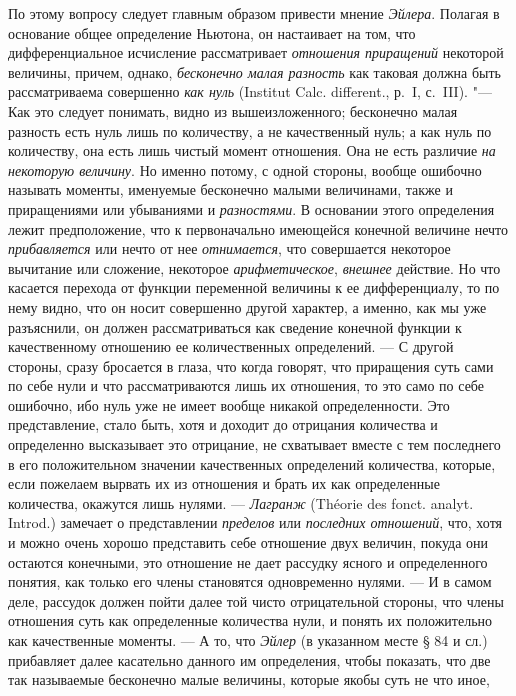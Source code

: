По этому вопросу следует главным образом привести мнение
{\em Эйлера}. Полагая в основание общее определение
Ньютона, он настаивает на том, что дифференциальное исчисление рассматривает
{\em отношения приращений} некоторой величины, причем,
однако, {\em бесконечно малая разность} как таковая
должна быть рассматриваема совершенно {\em как нуль}
(Institut Calc. different., р.~I, с.~III).
"--- Как это следует понимать, видно из
вышеизложенного; бесконечно малая разность есть нуль лишь по количеству, а
не качественный нуль; а как нуль по количеству, она есть лишь чистый момент
отношения. Она не есть различие {\em на некоторую
величину}. Но именно потому, с одной стороны, вообще ошибочно называть
моменты, именуемые бесконечно малыми величинами, также и приращениями или
убываниями и {\em разностями}. В основании этого
определения лежит предположение, что к первоначально имеющейся конечной
величине нечто {\em прибавляется} или нечто от нее
{\em отнимается}, что совершается некоторое вычитание
или сложение, некоторое {\em арифметическое},
{\em внешнее} действие. Но что касается перехода от
функции переменной величины к ее дифференциалу, то по нему видно, что он
носит совершенно другой характер, а именно, как мы уже разъяснили, он
должен рассматриваться как сведение конечной функции к качественному
отношению ее количественных определений. — С другой стороны, сразу
бросается в глаза, что когда говорят, что приращения суть сами по себе нули
и что рассматриваются лишь их отношения, то это само по себе ошибочно, ибо
нуль уже не имеет вообще никакой определенности. Это представление, стало
быть, хотя и доходит до отрицания количества и определенно высказывает это
отрицание, не схватывает вместе с тем последнего в его положительном
значении качественных определений количества, которые, если пожелаем
вырвать их из отношения и брать их как определенные количества, окажутся
лишь нулями. — {\em Лагранж} (Théorie des fonct. analyt. Introd.)
замечает о представлении {\em пределов} или {\em последних
отношений}, что, хотя и можно очень хорошо представить себе отношение двух
величин, покуда они остаются конечными, это отношение не дает рассудку
ясного и определенного понятия, как только его члены становятся
одновременно нулями. — И в самом деле, рассудок должен пойти далее той
чисто отрицательной стороны, что члены отношения суть как определенные
количества нули, и понять их положительно как качественные моменты. — А то,
что {\em Эйлер} (в указанном месте § 84 и сл.)
прибавляет далее касательно данного им определения, чтобы показать, что две
так называемые бесконечно малые величины, которые якобы суть не что иное,
